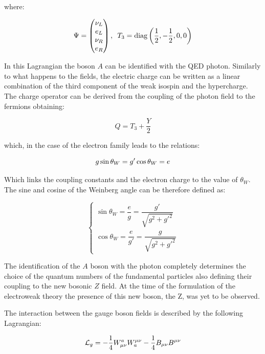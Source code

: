 where:

\begin{equation}
\Psi = \begin{pmatrix}
\nu_L\\ 
e_L\\ 
\nu_R\\ 
e_R
\end{pmatrix}, \, \, \, T_3 = \rm{diag}\left(\frac{1}{2},-\frac{1}{2},0,0\right)
\end{equation}

In this Lagrangian the boson $A$ can be identified with the QED photon. Similarly to what happens to the fields, the electric charge can be written as a linear combination of the third component of the weak isospin and the hypercharge. The charge operator can be derived from the coupling of the photon field to the fermions obtaining: 

\begin{equation}
Q = T_3 + \dfrac{Y}{2}
\end{equation}

which, in the case of the electron family leads to the relations:

\begin{equation}
g \opname{sin}\theta_W = g' \opname{cos}\theta_W = e
\end{equation}

Which links the coupling constants and the electron charge to the value of $\theta_W$. The sine and cosine of the Weinberg angle can be therefore defined as:

\begin{equation}
\left\{\begin{matrix}
\operatorname{sin}\theta_W = \dfrac{e}{g} = \dfrac{g'}{\sqrt{g^2+g'^2}}\\ 
\operatorname{cos}\theta_W = \dfrac{e}{g'} = \dfrac{g}{\sqrt{g^2+g'^2}}
\end{matrix}\right.
\label{eq:win_angle}
\end{equation}

The identification of the $A$ boson with the photon completely determines the choice of the quantum numbers of the fundamental particles also defining their coupling to the new bosonic $Z$ field. At the time of the formulation of the electroweak theory the presence of this new boson, the Z, was yet to be observed.

The interaction between the gauge boson fields is described by the following Lagrangian:

\begin{equation}
\l_g = -\dfrac{1}{4}W^a_{\mu\nu}W_a^{\mu\nu} -\dfrac{1}{4}B_{\mu\nu}B^{\mu\nu}
\label{eq:weak_free}
\end{equation}

